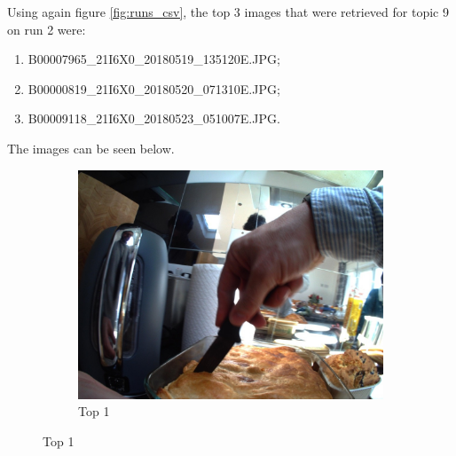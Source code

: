 Using again figure \ref{fig:runs_csv}, the top 3 images that were retrieved for topic 9 on run 2 were: 


\begin{enumerate}
  \itemsep0em
  \item B00007965\_21I6X0\_20180519\_135120E.JPG;
  \item B00000819\_21I6X0\_20180520\_071310E.JPG;
  \item B00009118\_21I6X0\_20180523\_051007E.JPG.
\end{enumerate}


The images can be seen below.
\begin{figure}[H]
    \centering
    \captionsetup{justification=centering}
  
    \begin{subfigure}{0.32\textwidth}
    \includegraphics[width=\textwidth]{Sections/7Results/images/run2top1.jpg} 
    \caption{Top 1}
  

\end{subfigure}
\end{figure}
